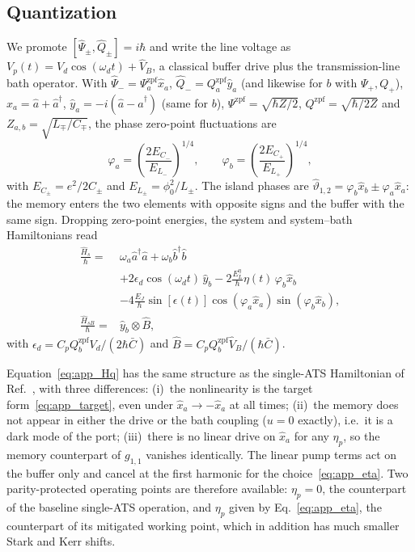 \documentclass[aps,prx,reprint,floatfix,amsmath,amssymb,longbibliography]{revtex4-2}
\begin{document}
\subsection{Quantization}
\label{app:quantization}

We promote $[\hat{\Psi}_\pm,\hat{Q}_\pm]=i\hbar$ and write the line
voltage as $V_p(t)=V_d\cos(\omega_dt)+\hat{V}_B$, a classical buffer drive
plus the transmission-line bath operator. With
$\hat{\Psi}_-=\Psi_a^{\mathrm{zpf}}\hat{x}_a$,
$\hat{Q}_-=Q_a^{\mathrm{zpf}}\hat{y}_a$ (and likewise for $b$ with
$\Psi_+,Q_+$), $\hat{x}_a=\hat{a}+\hat{a}^\dagger$,
$\hat{y}_a=-i(\hat{a}-\hat{a}^\dagger)$ (same for $b$),
$\Psi^{\mathrm{zpf}}=\sqrt{\hbar Z/2}$, $Q^{\mathrm{zpf}}=\sqrt{\hbar/2Z}$
and $Z_{a,b}=\sqrt{L_\mp/C_\mp}$, the phase zero-point fluctuations are
\begin{equation}
  \varphi_a=\left(\frac{2E_{C_-}}{E_{L_-}}\right)^{1/4},\qquad
  \varphi_b=\left(\frac{2E_{C_+}}{E_{L_+}}\right)^{1/4},
\end{equation}
with $E_{C_\pm}=e^2/2C_\pm$ and $E_{L_\pm}=\phi_0^2/L_\pm$. The island
phases are $\hat{\vartheta}_{1,2}=\varphi_b\hat{x}_b\pm\varphi_a\hat{x}_a$:
the memory enters the two elements with opposite signs and the buffer
with the same sign. Dropping zero-point energies, the system and
system--bath Hamiltonians read
\begin{equation}
\begin{aligned}
  \frac{\hat{H}_s}{\hbar}={}&\omega_a\hat{a}^\dagger\hat{a}
  +\omega_b\hat{b}^\dagger\hat{b}\\
  &+2\epsilon_d\cos(\omega_dt)\,\hat{y}_b
  -2\frac{E_L^\eta}{\hbar}\eta(t)\,\varphi_b\hat{x}_b\\
  &-4\frac{E_J}{\hbar}\sin[\epsilon(t)]
  \cos(\varphi_a\hat{x}_a)\sin(\varphi_b\hat{x}_b),\\
  \frac{\hat{H}_{sB}}{\hbar}={}&\hat{y}_b\otimes\hat{B},
\end{aligned}
\label{eq:app_Hq}
\end{equation}
with $\epsilon_d=C_pQ_b^{\mathrm{zpf}}V_d/(2\hbar\bar{C})$ and
$\hat{B}=C_pQ_b^{\mathrm{zpf}}\hat{V}_B/(\hbar\bar{C})$.

Equation~\eqref{eq:app_Hq} has the same structure as the single-ATS
Hamiltonian of Ref.~\cite{Carde2025Feb}, with three differences:
(i)~the nonlinearity is the target form~\eqref{eq:app_target}, even under
$\hat{x}_a\to-\hat{x}_a$ at all times;
(ii)~the memory does not appear in either the drive or the bath coupling
($u=0$ exactly), i.e.\ it is a dark mode of the port;
(iii)~there is no linear drive on $\hat{x}_a$ for any $\eta_p$, so the
memory counterpart of $g_{1,1}$ vanishes identically. The linear pump
terms act on the buffer only and cancel at the first harmonic for the
choice~\eqref{eq:app_eta}. Two parity-protected operating points are
therefore available: $\eta_p=0$, the counterpart of the baseline
single-ATS operation, and $\eta_p$ given by Eq.~\eqref{eq:app_eta}, the
counterpart of its mitigated working point, which in addition has much
smaller Stark and Kerr shifts.
\end{document}
